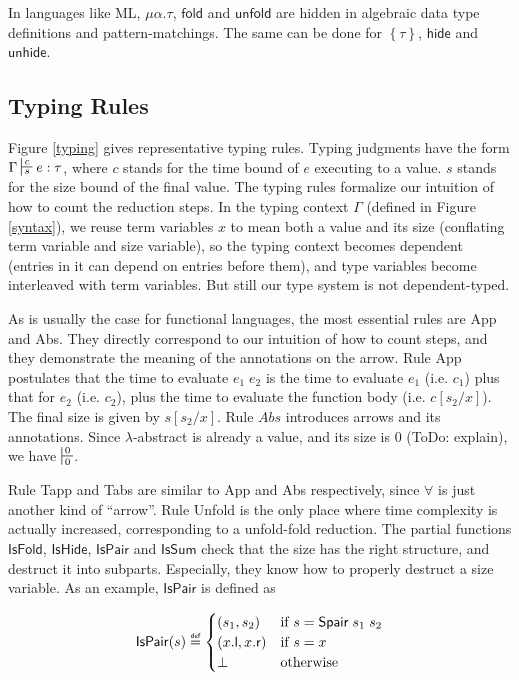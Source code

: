 \documentclass[preprint]{sigplanconf}
\newcommand{\thide}[1]{\left \{ #1 \right \}}
\newcommand{\typing}[4]{\sststile{#4}{#3}#1:#2}
\newcommand{\symfold}{\mathsf{fold}}
\newcommand{\symunfold}{\mathsf{unfold}}
\newcommand{\symhide}{\mathsf{hide}}
\newcommand{\symunhide}{\mathsf{unhide}}
\newcommand{\syml}{\mathsf{l}}
\newcommand{\symr}{\mathsf{r}}
\newcommand{\symSpair}{\mathsf{Spair}}
\newcommand\defeq{\mathrel{\overset{\makebox[0pt]{\mbox{\normalfont\tiny\sffamily def}}}{=}}}
\begin{document}
In languages like ML, $\mu\alpha.\tau$, $\symfold$ and $\symunfold$ are hidden in algebraic data type definitions and pattern-matchings. The same can be done for $\thide{\tau}$, $\symhide$ and $\symunhide$.

\subsection{Typing Rules}

Figure \ref{typing} gives representative typing rules. Typing judgments have the form $\Gamma\typing{e}{\tau}{c}{s}$, where $c$ stands for the time bound of $e$ executing to a value. $s$ stands for the size bound of the final value. The typing rules formalize our intuition of how to count the reduction steps. In the typing context $\Gamma$ (defined in Figure \ref{syntax}), we reuse term variables $x$ to mean both a value and its size (conflating term variable and size variable), so the typing context becomes dependent (entries in it can depend on entries before them), and type variables become interleaved with term variables. But still our type system is not dependent-typed.

As is usually the case for functional languages, the most essential rules are {\sc App} and {\sc Abs}. They directly correspond to our intuition of how to count steps, and they demonstrate the meaning of the annotations on the arrow. Rule {\sc App} postulates that the time to evaluate $e_1\;e_2$ is the time to evaluate $e_1$ (i.e. $c_1$) plus that for $e_2$ (i.e. $c_2$), plus the time to evaluate the function body (i.e. $c[s_2/x]$). The final size is given by $s[s_2/x]$. Rule $Abs$ introduces arrows and its annotations. Since $\lambda$-abstract is already a value, and its size is 0 (ToDo: explain), we have $\turnstile{s}{s}{0}{0}{n}$.

Rule {\sc Tapp} and {\sc Tabs} are similar to {\sc App} and {\sc Abs} respectively, since $\forall$ is just another kind of ``arrow''. Rule {\sc Unfold} is the only place where time complexity is actually increased, corresponding to a unfold-fold reduction. The partial functions $\mathsf{IsFold}$, $\mathsf{IsHide}$, $\mathsf{IsPair}$ and $\mathsf{IsSum}$ check that the size has the right structure, and destruct it into subparts. Especially, they know how to properly destruct a size variable. As an example, $\mathsf{IsPair}$ is defined as

$$
\mathsf{IsPair}(s)\defeq\begin{cases}
(s_1, s_2) & \mbox{if } s = \symSpair\;s_1\;s_2 \\
(x.\syml, x.\symr) & \mbox{if } s = x \\
\bot & \mbox{otherwise}\\
\end{cases}
$$
\end{document}
